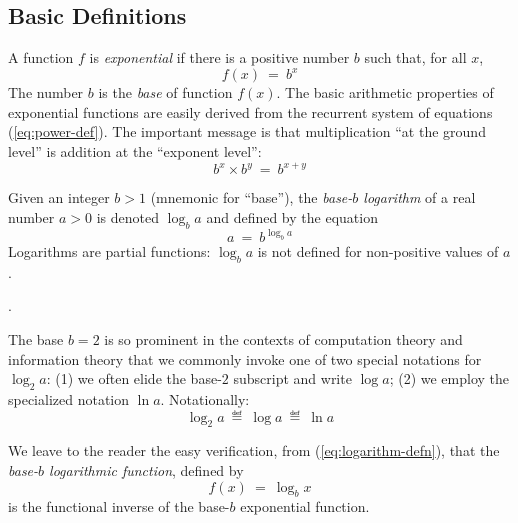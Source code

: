 \subsection{Basic Definitions}
\label{sec:exponential-function}

 

A function $f$ is {\it exponential} if there is a positive number $b$ such that, for all $x$,
\begin{equation}
\label{eq:exponential-defn}
f(x) \ = \ b^x
\end{equation}
The number $b$ is the {\it base} of function $f(x)$.  The basic arithmetic properties of exponential functions are easily derived from the recurrent system of equations (\ref{eq:power-def}).  The important message is that multiplication ``at the ground level'' is addition at the ``exponent level'':
\[ b^x \times b^y \ = \ b^{x+y} \]

  

Given an integer $b >1$ (mnemonic for ``base''), the {\em base-$b$ logarithm} of a real number $a > 0$ is denoted $\log_b a$ and defined by the equation
\begin{equation}
\label{eq:logarithm-defn}
a \ = \ b^{\log_b a}
\end{equation}
Logarithms are partial functions: $\log_b a$ is not defined for non-positive values of $a$.

\smallskip

. 

The base $b = 2$ is so prominent in the contexts of computation theory and information theory that we commonly invoke one of two special notations for $\log_2 a$: (1) we often elide the base-$2$ subscript and write $\log a$; (2) we employ the specialized notation $\ln a$.  Notationally:
\[ \log_2 a \ \eqdef \ \log a \ \eqdef \ \ln a \]

\smallskip

We leave to the reader the easy verification, from (\ref{eq:logarithm-defn}), that the {\it base-$b$ logarithmic function}, defined by
\begin{equation}
\label{eq:log-function-defn}
f(x) \ = \ \log_b x
\end{equation}
is the functional inverse of the base-$b$ exponential function.

